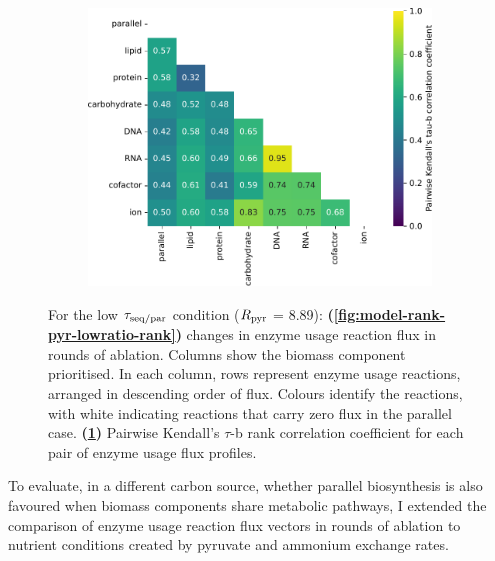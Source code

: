 \begin{figure}
\begin{subfigure}[t]{0.45\textwidth}
    \includegraphics[width=\linewidth]{CompareEnzUse_glc00p00_pyr08p89_ammUnres_2.pdf}
    \caption{
    }
    \label{fig:model-rank-pyr-lowratio-kendall}
  \end{subfigure}

  \caption[
    Changes in enzyme usage reaction flux and Kendall's $\tau$-b rank correlation coefficient for each pair, $\exchrate{pyr}$ = \SI{8.89}{\mmolgdwh}.
  ]{
    For the low $\tau_{\mathrm{seq}/\mathrm{par}}$ condition ($\exchrate{pyr}$ = \SI{8.89}{\mmolgdwh}):
    \textbf{(\ref{fig:model-rank-pyr-lowratio-rank})}
    changes in enzyme usage reaction flux in rounds of ablation.
    Columns show the biomass component prioritised.
    In each column, rows represent enzyme usage reactions, arranged in descending order of flux.
    Colours identify the reactions, with white indicating reactions that carry zero flux in the parallel case.
    \textbf{(\ref{fig:model-rank-pyr-lowratio-kendall})}
    Pairwise Kendall's $\tau$-b rank correlation coefficient \parencite{kendallTREATMENTTIESRANKING1945} for each pair of enzyme usage flux profiles.
  }
  \label{fig:model-rank-pyr-lowratio}
\end{figure}

To evaluate, in a different carbon source, whether parallel biosynthesis is also favoured when biomass components share metabolic pathways, I extended the comparison of enzyme usage reaction flux vectors in rounds of ablation to nutrient conditions created by pyruvate and ammonium exchange rates.

